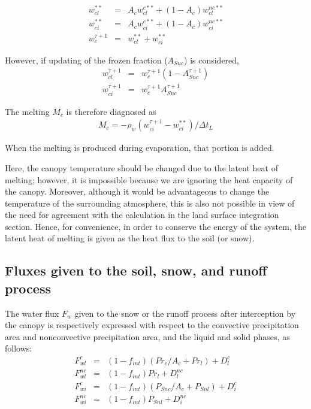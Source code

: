 \begin{eqnarray}
 w_{cl}^{\ast\ast} &=& A_c w_{cl}^{c**} + (1-A_c) w_{cl}^{nc**} \\
 w_{ci}^{\ast\ast} &=& A_c w_{ci}^{c**} + (1-A_c) w_{ci}^{nc**} \\
 w_c^{\tau+1} &=& w_{cl}^{\ast\ast} + w_{ci}^{\ast\ast}
\end{eqnarray}

However, if updating of the frozen fraction (\(A_{Snc}\)) is considered, \begin{eqnarray}
 w_{cl}^{\tau+1} &=& w_{c}^{\tau+1} (1-A_{Snc}^{\tau+1}) \\
 w_{ci}^{\tau+1} &=& w_{c}^{\tau+1} A_{Snc}^{\tau+1}
\end{eqnarray}

The melting \(M_c\) is therefore diagnosed as \begin{eqnarray}
 M_c = - \rho_w ( w_{ci}^{\tau+1} - w_{ci}^{\ast\ast} ) / \Delta t_L
\end{eqnarray}

When the melting is produced during evaporation, that portion is added.

Here, the canopy temperature should be changed due to the latent heat of melting; however, it is impossible because we are ignoring the heat capacity of the canopy. Moreover, although it would be
advantageous to change the temperature of the surrounding atmosphere, this is also not possible in view of the need for agreement with the calculation in the land surface integration section. Hence,
for convenience, in order to conserve the energy of the system, the latent heat of melting is given as the heat flux to the soil (or snow).

\hypertarget{fluxes-given-to-the-soil-snow-and-runoff-process}{%
\subsection{Fluxes given to the soil, snow, and runoff process}\label{fluxes-given-to-the-soil-snow-and-runoff-process}}

The water flux \(F_w\) given to the snow or the runoff process after interception by the canopy is respectively expressed with respect to the convective precipitation area and nonconvective
precipitation area, and the liquid and solid phases, as follows: \begin{eqnarray}
 F_{wl}^{c} &=& (1-f_{int})( Pr_c / A_c + Pr_l ) + D_{l}^{c} \\
 F_{wl}^{nc} &=&(1-f_{int}) Pr_l + D_{l}^{nc} \\
 F_{wi}^{c} &=& (1-f_{int})( P_{Snc} / A_c + P_{Snl} ) + D_{i}^{c} \\
 F_{wi}^{nc} &=&(1-f_{int}) P_{Snl} + D_{i}^{nc}
\end{eqnarray}


